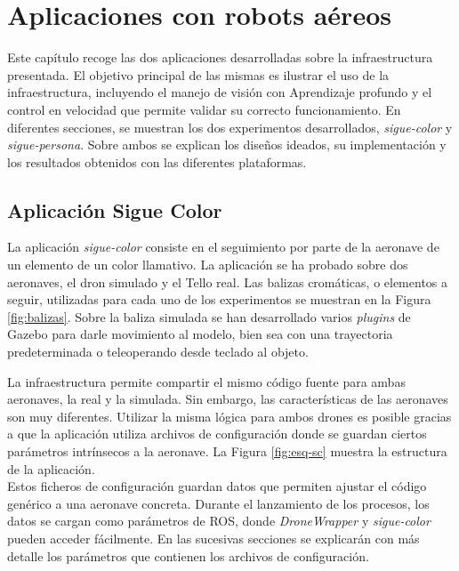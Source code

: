\documentclass[../main.tex]{subfiles}
\begin{document}
\chapter{Aplicaciones con robots aéreos} \label{cap:aplic}
Este capítulo recoge las dos aplicaciones desarrolladas sobre la infraestructura presentada. El objetivo principal de las mismas es ilustrar el uso de la infraestructura, incluyendo el manejo de visión con Aprendizaje profundo y el control en velocidad que permite validar su correcto funcionamiento. En diferentes secciones, se muestran los dos experimentos desarrollados, \emph{sigue-color} y \emph{sigue-persona}. Sobre ambos se explican los diseños ideados, su implementación y los resultados obtenidos con las diferentes plataformas.

\section{Aplicación Sigue Color} \label{section:aplic-color}
La aplicación \emph{sigue-color} consiste en el seguimiento por parte de la aeronave de un elemento de un color llamativo. La aplicación se ha probado sobre dos aeronaves, el dron simulado y el Tello real. Las balizas cromáticas, o elementos a seguir, utilizadas para cada uno de los experimentos se muestran en la Figura \ref{fig:balizas}. Sobre la baliza simulada se han desarrollado varios \emph{plugins} de Gazebo para darle movimiento al modelo, bien sea con una trayectoria predeterminada o teleoperando desde teclado al objeto.

\begin{figure}[ht]
\end{figure}

La infraestructura permite compartir el mismo código fuente para ambas aeronaves, la real y la simulada. Sin embargo, las características de las aeronaves son muy diferentes. Utilizar la misma lógica para ambos drones es posible gracias a que la aplicación utiliza archivos de configuración donde se guardan ciertos parámetros intrínsecos a la aeronave. La Figura \ref{fig:esq-sc} muestra la estructura de la aplicación. \\
Estos ficheros de configuración guardan datos que permiten ajustar el código genérico a una aeronave concreta. Durante el lanzamiento de los procesos, los datos se cargan como parámetros de ROS, donde \emph{DroneWrapper} y \emph{sigue-color} pueden acceder fácilmente. En las sucesivas secciones se explicarán con más detalle los parámetros que contienen los archivos de configuración.
\end{document}
